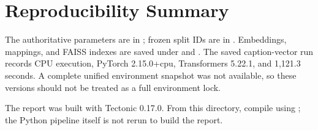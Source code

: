 \section{Reproducibility Summary}
\label{app:reproducibility}

The authoritative parameters are in ; frozen split IDs are in . Embeddings, mappings, and FAISS indexes are saved under  and . The saved caption-vector run records CPU execution, PyTorch 2.15.0+cpu, Transformers 5.22.1, and 1,121.3 seconds. A complete unified environment snapshot was not available, so these versions should not be treated as a full environment lock.

The report was built with Tectonic 0.17.0. From this directory, compile using ; the Python pipeline itself is not rerun to build the report.
